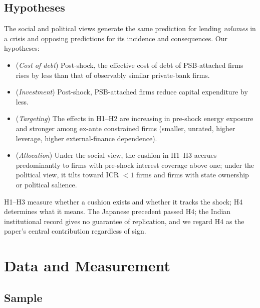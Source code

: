 \documentclass[12pt]{article}
\begin{document}
\subsection{Hypotheses}\label{sec:hypotheses}

The social and political views generate the same prediction for lending \emph{volumes} in a
crisis and opposing predictions for its incidence and consequences. Our hypotheses:

\begin{itemize}
\item[\textbf{H1}] (\emph{Cost of debt}) Post-shock, the effective cost of debt of
PSB-attached firms rises by less than that of observably similar private-bank firms.
\item[\textbf{H2}] (\emph{Investment}) Post-shock, PSB-attached firms reduce capital
expenditure by less.
\item[\textbf{H3}] (\emph{Targeting}) The effects in H1--H2 are increasing in pre-shock
energy exposure and stronger among ex-ante constrained firms (smaller, unrated, higher
leverage, higher external-finance dependence).
\item[\textbf{H4}] (\emph{Allocation}) Under the social view, the cushion in H1--H3 accrues
predominantly to firms with pre-shock interest coverage above one; under the political
view, it tilts toward ICR $<1$ firms and firms with state ownership or political salience.
\end{itemize}

H1--H3 measure whether a cushion exists and whether it tracks the shock; H4 determines what
it means. The Japanese precedent passed H4; the Indian institutional record gives no
guarantee of replication, and we regard H4 as the paper's central contribution regardless
of sign.

\section{Data and Measurement}\label{sec:data}

\subsection{Sample}
\end{document}

